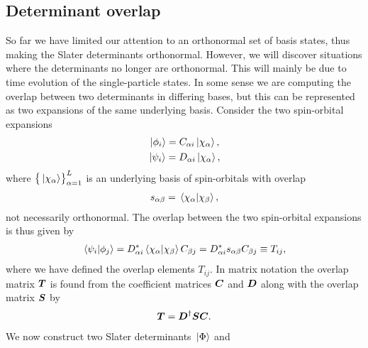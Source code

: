        \subsection{Determinant overlap}
            \label{subsec:determinant-overlap}
            So far we have limited our attention to an orthonormal set of basis
            states, thus making the Slater determinants orthonormal.
            However, we will discover situations where the determinants no
            longer are orthonormal.
            This will mainly be due to time evolution of the single-particle
            states.
            In some sense we are computing the overlap between two determinants
            in differing bases, but this can be represented as two expansions of
            the same underlying basis.
            Consider the two spin-orbital expansions
            \begin{gather}
                \ket*{\phi_i} = C_{\alpha i}\ket*{\chi_{\alpha}}, \\
                \ket*{\psi_i} = D_{\alpha i}\ket*{\chi_{\alpha}},
            \end{gather}
            where $\left\{ \ket*{\chi_{\alpha}} \right\}_{\alpha = 1}^{L}$ is an underlying
            basis of spin-orbitals with overlap
            \begin{align}
                s_{\alpha\beta}
                = \braket*{\chi_{\alpha}}{\chi_{\beta}},
            \end{align}
            not necessarily orthonormal.
            The overlap between the two spin-orbital expansions is thus given by
            \begin{align}
                \braket*{\psi_i}{\phi_j}
                = D^{*}_{\alpha i}
                \braket*{\chi_{\alpha}}{\chi_{\beta}}
                C_{\beta j}
                = D^{*}_{\alpha i}
                s_{\alpha\beta}
                C_{\beta j}
                \equiv
                T_{ij},
            \end{align}
            where we have defined the overlap elements $T_{ij}$.
            In matrix notation the overlap matrix $\boldsymbol{T}$ is found from the
            coefficient matrices $\boldsymbol{C}$ and $\boldsymbol{D}$ along with the overlap
            matrix $\boldsymbol{S}$ by
            \begin{align}
                \boldsymbol{T} = \boldsymbol{D}^{\dagger}\boldsymbol{S}\boldsymbol{C}.
            \end{align}
            We now construct two Slater determinants $\ket*{\Phi}$ and

